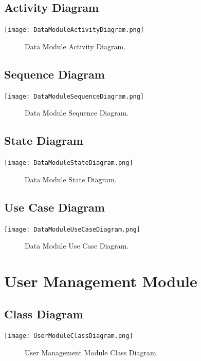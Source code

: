 \documentclass[12pt]{article}
\begin{document}
    \subsection{Activity Diagram}
        \texttt{[image: DataModuleActivityDiagram.png]}
        \begin{figure}[h]
            \caption{Data Module Activity Diagram.}
        \end{figure}

    \subsection{Sequence Diagram}
        \texttt{[image: DataModuleSequenceDiagram.png]}
        \begin{figure}[h]
            \caption{Data Module Sequence Diagram.}
        \end{figure}

	
	\subsection{State Diagram}
       \texttt{[image: DataModuleStateDiagram.png]}
        \begin{figure}[h]
        	\caption{Data Module State Diagram.}
        \end{figure}
	
	\subsection{Use Case Diagram}
        	\texttt{[image: DataModuleUseCaseDiagram.png]}
        	\begin{figure}[h]
        		\caption{Data Module Use Case Diagram.}
        	\end{figure}
	
	\section{User Management Module}
	
	\subsection{Class Diagram}
        \texttt{[image: UserModuleClassDiagram.png]}
        \begin{figure}[h]
            \caption{User Management Module Class Diagram.}
        \end{figure}
    
\end{document}
